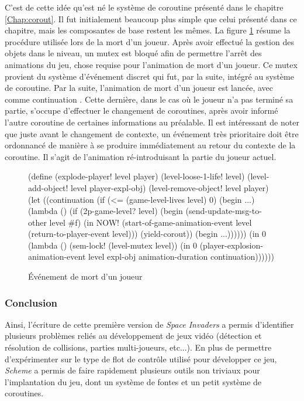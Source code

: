 \documentclass[12pt,twoside,letterpaper,francais]{book}
\newcommand{\si}{{\textit{Space Invaders }}}
\newcommand{\Schemelang}{{\textit{Scheme }}}
\newcommand{\scheme}[1]{\selectlanguage{english}{\tt #1}\selectlanguage{french}}
\begin{document}
C'est de cette idée qu'est né le système de coroutine présenté dans le
chapitre \ref{Chap:corout}. Il fut initialement beaucoup plus simple
que celui présenté dans ce chapitre, mais les composantes de base
restent les mêmes. La figure \ref{Exp:si-mort} résume la procédure
utilisée lors de la mort d'un joueur. Après avoir effectué la gestion
des objets dans le niveau, un mutex est bloqué afin de permettre
l'arrêt des animations du jeu, chose requise pour l'animation de mort
d'un joueur. Ce mutex provient du système d'événement discret qui fut,
par la suite, intégré au système de coroutine. Par la suite,
l'animation de mort d'un joueur est lancée, avec comme continuation
\scheme{continuation}. Cette dernière, dans le cas où le joueur n'a
pas terminé sa partie, s'occupe d'effectuer le changement de
coroutines, après avoir informé l'autre coroutine de certaines
informations au préalable. Il est intéressant de noter que juste avant
le changement de contexte, un événement très prioritaire doit être
ordonnancé de manière à se produire immédiatement au retour du
contexte de la coroutine. Il s'agit de l'animation ré-introduisant la
partie du joueur actuel.

\begin{figure}[htb!]
  \begin{schemecode}
(define (explode-player! level player)
  (level-loose-1-life! level)
  (level-add-object! level player-expl-obj)
  (level-remove-object! level player)
  (let ((continuation
         (if (<= (game-level-lives level) 0)
             (begin ...)
             (lambda ()
               (if (2p-game-level? level)
                   (begin
                     (send-update-msg-to-other level \#f)
                     (in NOW! (start-of-game-animation-event
                               level (return-to-player-event level)))
                     (yield-corout))
                   (begin ...))))))
     (in 0 (lambda ()
            (sem-lock! (level-mutex level))
            (in 0 (player-explosion-animation-event
                   level expl-obj animation-duration continuation))))))
   \end{schemecode}
  \caption{Événement de mort d'un joueur}
  \label{Exp:si-mort}
\end{figure}


\FloatBarrier
\subsubsection{Conclusion}
Ainsi, l'écriture de cette première version de \si a permis
d'identifier plusieurs problèmes reliés au développement de jeux vidéo
(détection et résolution de collisions, parties multi-joueurs,
etc...). En plus de permettre d'expérimenter sur le type de flot de
contrôle utilisé pour développer ce jeu, \Schemelang a permis de faire
rapidement plusieurs outils non triviaux pour l'implantation du jeu,
dont un système de fontes et un petit système de coroutines.
\end{document}
